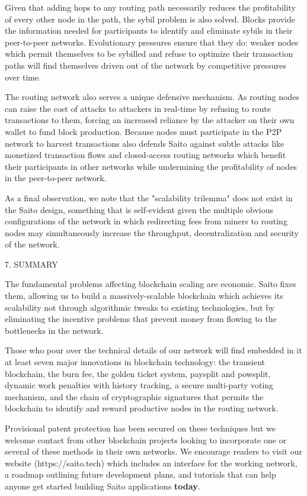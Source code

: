 \documentclass[11pt, oneside]{article}   	%
\begin{document}
\begin{multicols}{2}
Given that adding hops to any routing path necessarily reduces the profitability of every other node in the path, the sybil problem is also solved. Blocks provide the information needed for participants to identify and eliminate sybils in their peer-to-peer networks. Evolutionary pressures ensure that they do: weaker nodes which permit themselves to be sybilled and refuse to optimize their transaction paths will find themselves driven out of the network by competitive pressures over time.

The routing network also serves a unique defensive mechanism. As routing nodes can raise the cost of attacks to attackers in real-time by refusing to route transactions to them, forcing an increased reliance by the attacker on their own wallet to fund block production. Because nodes must participate in the P2P network to harvest transactions also defends Saito against subtle attacks like monetized transaction flows and closed-access routing networks which benefit their participants in other networks while undermining the profitability of nodes in the peer-to-peer network.

As a final observation, we note that the "scalability trilemma" does not exist in the Saito design, something that is self-evident given the multiple obvious configurations of the network in which redirecting fees from miners to routing nodes may simultaneously increase the throughput, decentralization and security of the network.


7. SUMMARY

The fundamental problems affecting blockchain scaling are economic. Saito fixes them, allowing us to build a massively-scalable blockchain which achieves its scalability not through algorithmic tweaks to existing technologies, but by eliminating the incentive problems that prevent money from flowing to the bottlenecks in the network.

Those who pour over the technical details of our network will find embedded in it at least seven major innovations in blockchain technology: the transient blockchain, the burn fee, the golden ticket system, paysplit and powsplit, dynamic work penalties with history tracking, a secure multi-party voting mechanism, and the chain of cryptographic signatures that permits the blockchain to identify and reward productive nodes in the routing network.

Provisional patent protection has been secured on these techniques but we welcome contact from other blockchain projects looking to incorporate one or several of these methods in their own networks. We encourage readers to visit our website (https://saito.tech) which includes an interface for the working network, a roadmap outlining future development plans, and tutorials that can help anyone get started building Saito applications \textbf{today}.

\end{multicols}
\end{document}
